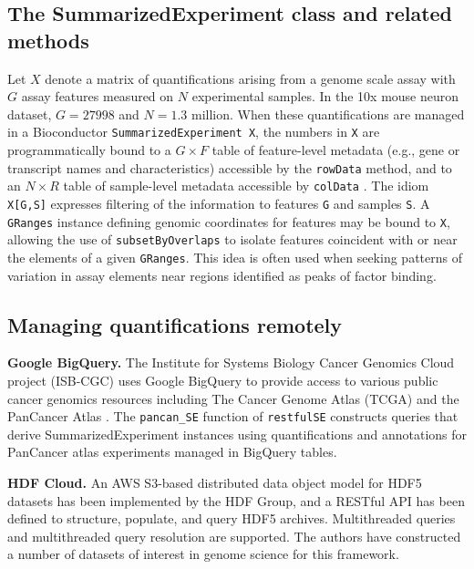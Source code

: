 \documentclass[applications]{gen-bioinformatics}
\begin{document}
\subsection*{The SummarizedExperiment class and related methods}

Let $X$ denote a matrix of quantifications arising from a genome
scale assay with $G$ assay features measured on $N$ experimental
samples.  In the 10x mouse neuron dataset, $G=27998$ and $N=1.3$ million.
When these quantifications are managed in a Bioconductor \verb+SummarizedExperiment X+, the numbers in \verb+X+ are programmatically bound to a $G \times F$
table of feature-level metadata (e.g., gene or transcript names and
characteristics) accessible by the \verb+rowData+ method, and to an $N \times R$ table of sample-level metadata accessible by \verb+colData+ \citep{Huber2015}. 
The idiom \verb+X[G,S]+ expresses filtering of 
the information
to features \verb+G+ and samples \verb+S+.  A \verb+GRanges+ 
instance \citep{Lawrence2013} defining genomic coordinates for features may be bound to \verb+X+,
allowing the use of \verb+subsetByOverlaps+ to isolate features
coincident with or near the elements of a given \verb+GRanges+.
This idea is often used when seeking patterns of variation in
assay elements near regions identified as peaks of factor binding.

\subsection*{Managing quantifications remotely}

\noindent
\textbf{Google BigQuery.} The Institute for Systems Biology Cancer
Genomics Cloud project (ISB-CGC) \citep{ISBCGC} uses 
Google BigQuery to provide access to
various public cancer genomics resources including
The Cancer Genome Atlas (TCGA) and the PanCancer Atlas \citep{Hoadley2018}.
The \verb+pancan_SE+
function of \verb+restfulSE+ constructs queries that derive
SummarizedExperiment instances using quantifications and annotations
for PanCancer atlas experiments
managed in BigQuery tables.  

\noindent
\textbf{HDF Cloud.}  
An AWS S3-based distributed data object model for HDF5
datasets has been implemented by the HDF Group, and
a RESTful API has been defined to structure, populate,
and query HDF5 archives.  Multithreaded queries and
multithreaded query resolution are supported.
The authors have constructed a number of datasets of
interest in genome science for this framework.
\end{document}
